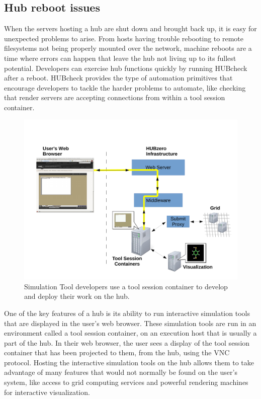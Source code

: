 \documentclass[letterpaper]{scrartcl}
\begin{document}
\subsection{Hub reboot issues}

When the servers hosting a hub are shut down and brought back up, it is easy
for unexpected problems to arise. From hosts having trouble rebooting to remote
filesystems not being properly mounted over the network, machine reboots are a
time where errors can happen that leave the hub not living up to its fullest
potential.  Developers can exercise hub functions quickly by running HUBcheck
after a reboot. HUBcheck provides the type of automation primitives that
encourage developers to tackle the harder problems to automate, like checking
that render servers are accepting connections from within a tool session
container.

\begin{figure}[ht]
  \centering
  \includegraphics[width=\textwidth]
    {../../images/hubcheck_block_diagram/tool_session_container_block.pdf}
  \caption{ Simulation Tool developers use a tool session container to
            develop and deploy their work on the hub. }
  \label{fig:tool_session_container_block_diagram}
\end{figure}

One of the key features of a hub is its ability to run interactive simulation
tools that are displayed in the user's web browser. These simulation tools are
run in an environment called a tool session container, on an execution host
that is usually a part of the hub. In their web browser, the user sees a
display of the tool session container that has been projected to them, from the
hub, using the VNC protocol. Hosting the interactive simulation tools on the
hub allows them to take advantage of many features that would not normally be
found on the user's system, like access to grid computing services and powerful
rendering machines for interactive visualization.
\end{document}
